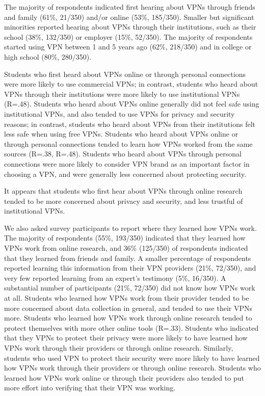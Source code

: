 The majority of respondents indicated first hearing about VPNs through friends
and family (61\%, 21/350) and/or online (53\%, 185/350). Smaller but
significant minorities reported hearing about VPNs through their institutions,
such as their school (38\%, 132/350) or employer (15\%, 52/350). The majority
of respondents started using VPN between 1 and 5 years ago (62\%, 218/350) and
in college or high school (80\%, 280/350).

Students who first heard about VPNs online or through personal connections
were more likely to use commercial VPNs; in contrast, students who heard about
VPNs through their institutions were more likely to use institutional VPNs
(R=.48). Students who heard about VPNs online generally did not feel safe
using institutional VPNs, and also tended to use VPNs for privacy and security
reasons; in contrast, students who heard about VPNs from their institutions
felt less safe when using free VPNs. Students who heard about VPNs online or
through personal connections tended to learn how VPNs worked from the same
sources (R=.38, R=.48). Students who heard about VPNs through personal
connections were more likely to consider VPN brand as an important factor in
choosing a VPN, and were generally less concerned about protecting security.

It appears that students who first hear about VPNs through online research
tended to be more concerned about privacy and security, and less trustful of
institutional VPNs. 

We also asked survey participants to report where they learned how VPNs work.
The majority of respondents (55\%, 193/350) indicated that they learned how
VPNs work from online research, and 36\% (125/350) of respondents indicated
that they learned from friends and family. A smaller percentage of respondents
reported learning this information from their VPN providers (21\%, 72/350),
and very few reported learning from an expert’s testimony (5\%, 16/350). A
substantial number of participants (21\%, 72/350) did not know how VPNs work
at all.  Students who learned how VPNs work from their provider tended to be
more concerned about data collection in general, and tended to use their VPNs
more. Students who learned how VPNs work through online research tended to
protect themselves with more other online tools (R=.33). Students who
indicated that they VPNs to protect their privacy were more likely to have
learned how VPNs work through their providers or through online research.
Similarly, students who used VPN to protect their security were more likely to
have learned how VPNs work through their providers or through online research.
Students who learned how VPNs work online or through their providers also
tended to put more effort into verifying that their VPN was working.

